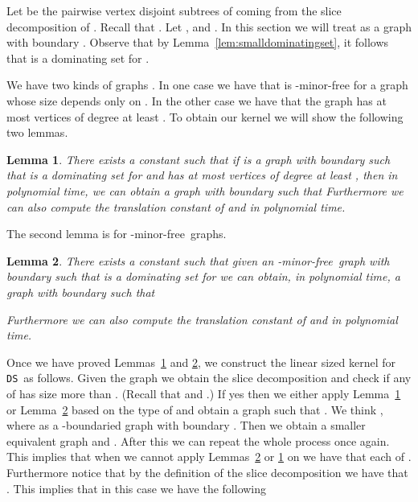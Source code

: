 \documentclass[11pt]{article}
\newtheorem{lemma}{Lemma}
\newcommand{\Hmf}{-minor-free}
\newcommand{\tDS}{{\texttt{\sc DS}}}
\begin{document}
Let  be the pairwise vertex disjoint  subtrees   of  coming 
from the slice decomposition of . Recall that .
Let  ,  and .  
In this section we will treat   as a  graph with boundary .  
Observe that by Lemma~\ref{lem:smalldominatingset}, it follows that 
 is a dominating set for . 

We have two kinds of graphs . In one case we have that  is -minor-free for a graph  whose size  depends only on . In the other case we have that the graph  has at most  vertices of degree at least . To obtain our kernel we will show the following  two lemmas. 

\begin{lemma}
\label{lem:newperspectivequasi}
There exists a constant  such that if    is a graph with boundary  such that  is a dominating set for  and  has at most  vertices of degree at least , then in polynomial time, we can obtain a graph  with boundary  
such that  
Furthermore we can also compute the translation constant  of  and  in polynomial time. 
\end{lemma}

The second lemma is for \Hmf \, graphs. 


\begin{lemma}
\label{lem:newperspectiveHminor}
There exists a constant  such that  given an \Hmf \, graph   with boundary  
such that  is a dominating set for  we can obtain, in polynomial time, a graph  with boundary  such that 
 
Furthermore we can also compute the translation constant  of  and  in polynomial time. 
\end{lemma}

Once we have proved Lemmas~\ref{lem:newperspectivequasi} and \ref{lem:newperspectiveHminor}, 
we construct the linear sized kernel for \tDS \, as follows. Given the graph  we 
obtain the slice decomposition and check if any of  has size more than . (Recall that 
 and .) 
 If yes then we either apply  
Lemma~\ref{lem:newperspectivequasi} or Lemma~\ref{lem:newperspectiveHminor} based on the type of  
and obtain a graph  such that  . We think 
, where  as a -boundaried graph with 
boundary . Then we obtain  a smaller equivalent graph  and .  After this we can 
repeat the whole process once again. This implies that when we cannot apply Lemmas~\ref{lem:newperspectiveHminor} or  
\ref{lem:newperspectivequasi}  on  we have that each of 
.  Furthermore notice that by the definition of the slice decomposition we have that . This implies that in this case we have the 
following
\end{document}
